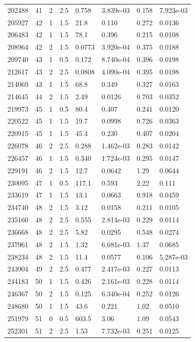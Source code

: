 \documentclass[preview]{standalone}
\begin{document}
{{{{\begin{tabular}{L{1.2cm}C{1.2cm} C{0.3cm}C{0.5cm} C{1.4cm}C{1.4cm} C{1.4cm}C{1.4cm}}
  202488  &    41  & 2     & 2.5 &  0.758  & 3.839e-03  & 0.158 &  7.923e-03   \\ 
  205927  &    42  & 1     & 1.5 &  21.8  & 0.110  & 0.272 &  0.0136   \\ 
  206483  &    42  & 1     & 1.5 &  78.1  & 0.396  & 0.215 &  0.0108   \\ 
  208964  &    42  & 2     & 1.5 &  0.0773  & 3.920e-04  & 0.375 &  0.0188   \\ 
  209740  &    43  & 1     & 0.5 &  0.172  & 8.740e-04  & 0.396 &  0.0198   \\ 
  212617  &    43  & 2     & 2.5 &  0.0808  & 4.090e-04  & 0.395 &  0.0198   \\ 
  214069  &    43  & 1     & 1.5 &  68.8  & 0.349  & 0.327 &  0.0163   \\ 
  214645  &    44  & 2     & 1.5 &  2.49  & 0.0126  & 0.703 &  0.0352   \\ 
  219973  &    45  & 1     & 0.5 &  80.4  & 0.407  & 0.241 &  0.0120   \\ 
  220522  &    45  & 1     & 1.5 &  19.7  & 0.0998  & 0.726 &  0.0363   \\ 
  220915  &    45  & 1     & 1.5 &  45.4  & 0.230  & 0.407 &  0.0204   \\ 
  226078  &    46  & 2     & 2.5 &  0.288  & 1.462e-03  & 0.283 &  0.0142   \\ 
  226457  &    46  & 1     & 1.5 &  0.340  & 1.724e-03  & 0.295 &  0.0147   \\ 
  229191  &    46  & 2     & 1.5 &  12.7  & 0.0642  & 1.29 &  0.0644   \\ 
  230095  &    47  & 1     & 0.5 &  117.1  & 0.593  & 2.22 &  0.111   \\ 
  233619  &    47  & 1     & 1.5 &  13.1  & 0.0663  & 0.918 &  0.0459   \\ 
  234740  &    48  & 2     & 1.5 &  3.12  & 0.0158  & 0.211 &  0.0105   \\ 
  235160  &    48  & 2     & 2.5 &  0.555  & 2.814e-03  & 0.229 &  0.0114   \\ 
  236668  &    48  & 2     & 2.5 &  5.82  & 0.0295  & 0.548 &  0.0274   \\ 
  237961  &    48  & 2     & 1.5 &  1.32  & 6.681e-03  & 1.37 &  0.0685   \\ 
  238234  &    48  & 2     & 1.5 &  11.4  & 0.0577  & 0.106 &  5.287e-03   \\ 
  243904  &    49  & 2     & 2.5 &  0.477  & 2.417e-03  & 0.227 &  0.0113   \\ 
  244183  &    50  & 1     & 1.5 &  0.426  & 2.161e-03  & 0.228 &  0.0114   \\ 
  246367  &    50  & 2     & 1.5 &  0.125  & 6.340e-04  & 0.252 &  0.0126   \\ 
  248680  &    50  & 1     & 1.5 &  43.6  & 0.221  & 1.02 &  0.0510   \\ 
  251979  &    51  & 0     & 0.5 &  603.5  & 3.06  & 1.09 &  0.0543   \\ 
  252301  &    51  & 2     & 2.5 &  1.53  & 7.732e-03  & 0.251 &  0.0125   \\ 
\hline 
\end{tabular} 

}}}}
\end{document}
